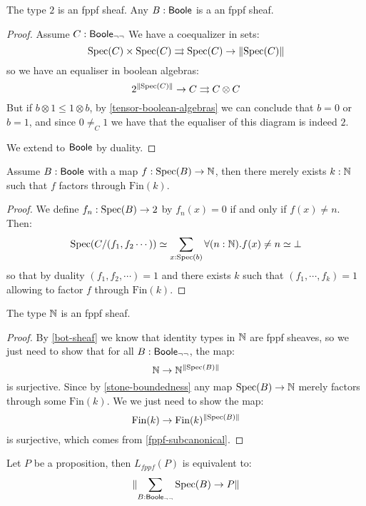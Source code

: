 \begin{lemma}\label{fppf-subcanonical}
The type ${2}$ is an fppf sheaf. Any $B:\mathsf{Boole}$ is a an fppf sheaf.
\end{lemma}

\begin{proof}
Assume $C:\mathsf{Boole}_{\neg\neg}$ We have a coequalizer in sets:
\[\operatorname{Spec}(C)\times\operatorname{Spec}(C) \rightrightarrows \operatorname{Spec}(C)\to \lVert \operatorname{Spec}(C) \rVert \]
so we have an equaliser in boolean algebras:
\[ {2}^{\lVert \operatorname{Spec}(C) \rVert}\to C\rightrightarrows C\otimes C \]
But if $b\otimes 1 \leq 1\otimes b$, by \cref{tensor-boolean-algebras} we can conclude that $b=0$ or $b=1$, and since $0\not=_C1$ we have that the equaliser of this diagram is indeed ${2}$.

We extend to $\mathsf{Boole}$ by duality.
\end{proof}

\begin{lemma}\label{stone-boundedness}
Assume $B:\mathsf{Boole}$ with a map $f:\operatorname{Spec}(B)\to\mathbb{N}$, then there merely exists $k:\mathbb{N}$ such that $f$ factors through $\mathrm{Fin}(k)$.
\end{lemma}

\begin{proof}
We define $f_n:\operatorname{Spec}(B)\to {2}$ by $f_n(x) = 0$ if and only if $f(x)\not=n$. Then:
\[\operatorname{Spec}(C/(f_1,f_2\cdots)) \simeq \sum_{x:\operatorname{Spec}(b)}\forall (n:\mathbb{N}). f(x)\not=n \simeq \bot\]
so that by duality $(f_1,f_2,\cdots) = 1$ and there exists $k$ such that $(f_1,\cdots,f_k)=1$ allowing to factor $f$ through $\mathrm{Fin}(k)$.
\end{proof}

\begin{lemma}\label{nat-sheaf}
The type $\mathbb{N}$ is an fppf sheaf.
\end{lemma}

\begin{proof}
By \cref{bot-sheaf} we know that identity types in $\mathbb{N}$ are fppf sheaves, so we just need to show that for all $B:\mathsf{Boole}_{\neg\neg}$, the map:
\[\mathbb{N}\to \mathbb{N}^{\lVert \operatorname{Spec}(B) \rVert}\]
is surjective. Since by \cref{stone-boundedness} any map $\operatorname{Spec}(B)\to \mathbb{N}$ merely factors through some $\mathrm{Fin}(k)$. We we just need to show the map:
\[\mathrm{Fin}(k)\to \mathrm{Fin}(k)^{\lVert \operatorname{Spec}(B) \rVert}\]
is surjective, which comes from \cref{fppf-subcanonical}.
\end{proof}

\begin{lemma}\label{proposition-fppf-sheaf}
Let $P$ be a proposition, then $L_{fppf}(P)$ is equivalent to:
\[\lVert \sum_{B:\mathsf{Boole}_{\neg\neg}} \operatorname{Spec}(B)\to P \rVert\]
\end{lemma}

